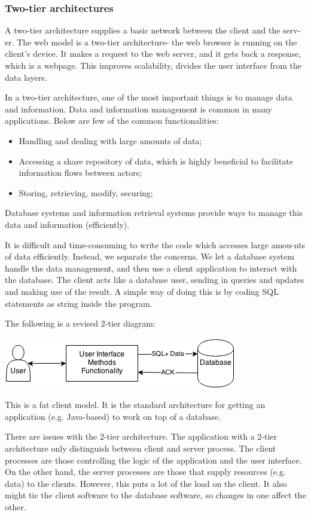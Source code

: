 \documentclass[a4paper, openany]{memoir}
\begin{document}
\subsubsection{Two-tier architectures}
A two-tier architecture supplies a basic network between the client and the serv-er. The web model is a two-tier architecture- the web browser is running on the client's device. It makes a request to the web server, and it gets back a response, which is a webpage. This improves scalability, divides the user interface from the data layers.

In a two-tier architecture, one of the most important things is to manage data and information. Data and information management is common in many applications. Below are few of the common functionalities:
\begin{itemize}
    \item Handling and dealing with large amounts of data;
    \item Accessing a share repository of data, which is highly beneficial to facilitate information flows between actors;
    \item Storing, retrieving, modify, securing;
\end{itemize}
Database systems and information retrieval systems provide ways to manage this data and information (efficiently).

It is difficult and time-consuming to write the code which accesses large amou-nts of data efficiently. Instead, we separate the concerns. We let a database system handle the data management, and then use a client application to interact with the database. The client acts like a database user, sending in queries and updates and making use of the result. A simple way of doing this is by coding SQL statements as string inside the program.

The following is a revised 2-tier diagram:
\begin{center}
    \includegraphics[scale=0.8]{src/L7I2.png}
\end{center}
This is a fat client model. It is the standard architecture for getting an application (e.g. Java-based) to work on top of a database.

There are issues with the 2-tier architecture. The application with a 2-tier architecture only distinguish between client and server process. The client processes are those controlling the logic of the application and the user interface. On the other hand, the server processes are those that supply resources (e.g. data) to the clients. However, this puts a lot of the load on the client. It also might tie the client software to the database software, so changes in one affect the other.
\end{document}
